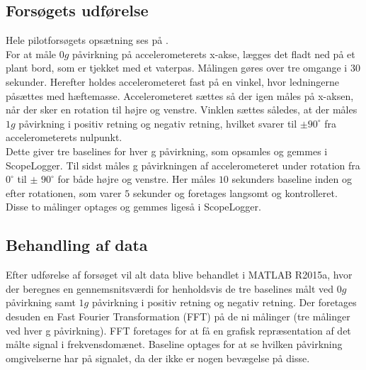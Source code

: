 \subsection{Forsøgets udførelse}
Hele pilotforsøgets opsætning ses på . \\
For at måle $0g$ påvirkning på accelerometerets x-akse, lægges det fladt ned på et plant bord, som er tjekket med et vaterpas. Målingen gøres over tre omgange i $30$ sekunder. Herefter holdes accelerometeret fast på en vinkel, hvor ledningerne påsættes med hæftemasse. Accelerometeret sættes så der igen måles på x-aksen, når der sker en rotation til højre og venstre. Vinklen sættes således, at der måles $1g$ påvirkning i positiv retning og negativ retning, hvilket svarer til $\pm90^{\circ}$ fra accelerometerets nulpunkt. \\
Dette giver tre baselines for hver g påvirkning, som opsamles og gemmes i ScopeLogger. %
Til sidst måles g påvirkningen af accelerometeret under rotation fra $0^{\circ}$ til $\pm$ $90^{\circ}$ for både højre og venstre. Her måles $10$ sekunders baseline inden og efter rotationen, som varer $5$ sekunder og foretages langsomt og kontrolleret. Disse to målinger optages og gemmes ligeså i ScopeLogger. \\
\subsection{Behandling af data}
Efter udførelse af forsøget vil alt data blive behandlet i MATLAB R2015a, hvor der beregnes en gennemsnitsværdi for henholdsvis de tre baselines målt ved $0g$ påvirkning samt $1g$ påvirkning i positiv retning og negativ retning. Der foretages desuden en Fast Fourier Transformation (FFT) på de ni målinger (tre målinger ved hver g påvirkning). FFT foretages for at få en grafisk repræsentation af det målte signal i frekvensdomænet. Baseline optages for at se hvilken påvirkning omgivelserne har på signalet, da der ikke er nogen bevægelse på disse.

